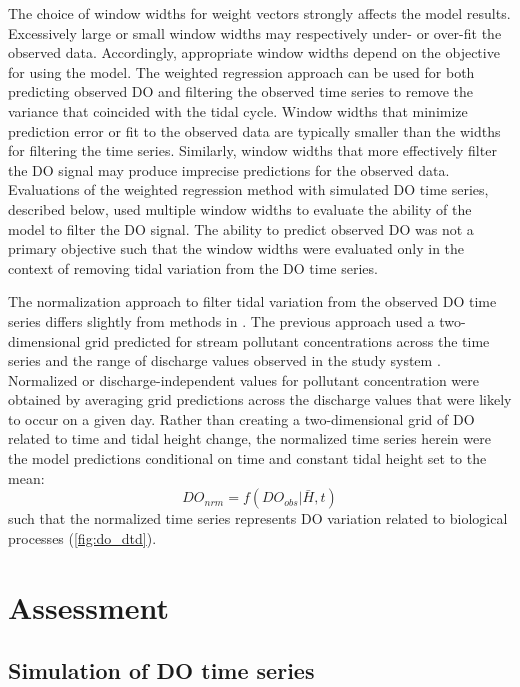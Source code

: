 \documentclass[letterpaper,12pt,oneside]{article}\usepackage[]{graphicx}\usepackage[]{color}
\begin{document}
The choice of window widths for weight vectors strongly affects the model results.  Excessively large or small window widths may respectively under- or over-fit the observed data.  Accordingly, appropriate window widths depend on the objective for using the model.  The weighted regression approach can be used for both predicting observed \ac{DO} and filtering the observed time series to remove the variance that coincided with the tidal cycle.  Window widths that minimize prediction error or fit to the observed data are typically smaller than the widths for filtering the time series.  Similarly, window widths that more effectively filter the \ac{DO} signal may produce imprecise predictions for the observed data.  Evaluations of the weighted regression method with simulated \ac{DO} time series, described below, used multiple window widths to evaluate the ability of the model to filter the \ac{DO} signal.  The ability to predict observed \ac{DO} was not a primary objective such that the window widths were evaluated only in the context of removing tidal variation from the \ac{DO} time series.  

The normalization approach to filter tidal variation from the observed \ac{DO} time series differs slightly from methods in \citet{Hirsch10}.  The previous approach used a two-dimensional grid predicted for stream pollutant concentrations across the time series and the range of discharge values observed in the study system \citep{Hirsch10}.  Normalized or discharge-independent values for pollutant concentration were obtained by averaging grid predictions across the discharge values that were likely to occur on a given day.  Rather than creating a two-dimensional grid of \ac{DO} related to time and tidal height change, the normalized time series herein were the model predictions conditional on time and constant tidal height set to the mean:
\begin{equation} \label{do_nrm}
DO_{nrm} = f(DO_{obs}|\bar{H}, t)
\end{equation}
such that the normalized time series represents \ac{DO} variation related to biological processes (\cref{fig:do_dtd}).   

\section{Assessment}

\subsection{Simulation of \ac{DO} time series}
\end{document}
